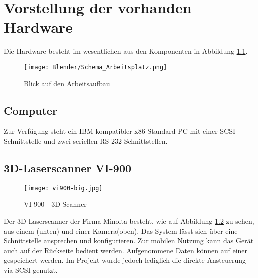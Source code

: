 \chapter{Vorstellung der vorhanden Hardware}
\label{sec:Hardware}
Die Hardware besteht im wesentlichen aus den Komponenten in Abbildung \ref{fig:Übersicht}.
\begin{figure}[htb]
\centering
\texttt{[image: Blender/Schema\_Arbeitsplatz.png]}
\caption{Blick auf den Arbeitsaufbau}
\label{fig:Übersicht}
\end{figure}

\section{Computer}
Zur Verfügung steht ein IBM kompatibler x86 Standard PC mit einer SCSI-Schnittstelle und zwei seriellen RS-232-Schnittstellen. 

\section{3D-Laserscanner VI-900}
\begin{figure}[htb]
\centering
\texttt{[image: vi900-big.jpg]}
\caption{VI-900 - 3D-Scanner}
\label{fig:VI900}
\end{figure}
Der 3D-Laserscanner  der Firma Minolta besteht, wie auf Abbildung \ref{fig:VI900} zu sehen, aus einem (unten) und einer Kamera(oben). Das System lässt sich über eine -Schnittstelle ansprechen und konfigurieren. Zur mobilen Nutzung kann das Gerät auch auf der Rückseite bedient werden. Aufgenommene Daten können auf einer  gespeichert werden. Im Projekt wurde jedoch lediglich die direkte Ansteuerung via SCSI genutzt.
